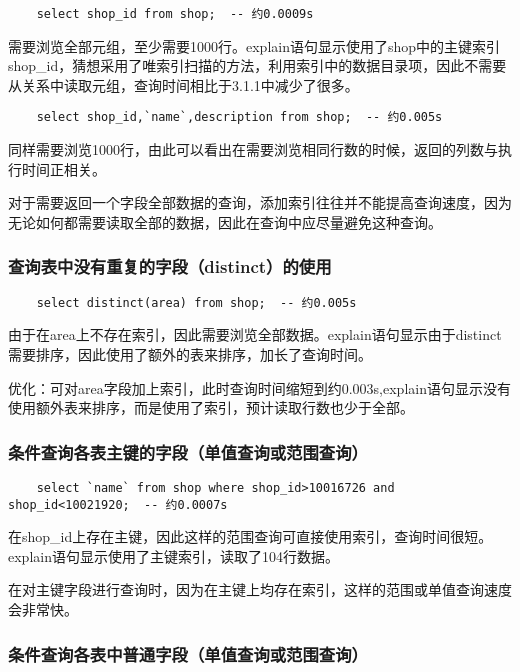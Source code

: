 \documentclass[a4paper, 11pt, nofonts, nocap, fancyhdr]{ctexart}
\begin{document}
	\begin{lstlisting}
	select shop_id from shop;  -- 约0.0009s
	\end{lstlisting}

需要浏览全部元组，至少需要1000行。explain语句显示使用了shop中的主键索引shop_id，猜想采用了唯索引扫描的方法，利用索引中的数据目录项，因此不需要从关系中读取元组，查询时间相比于3.1.1中减少了很多。

	\begin{lstlisting}
	select shop_id,`name`,description from shop;  -- 约0.005s
	\end{lstlisting}

同样需要浏览1000行，由此可以看出在需要浏览相同行数的时候，返回的列数与执行时间正相关。

对于需要返回一个字段全部数据的查询，添加索引往往并不能提高查询速度，因为无论如何都需要读取全部的数据，因此在查询中应尽量避免这种查询。

\subsubsection{查询表中没有重复的字段（distinct）的使用}

	\begin{lstlisting}
	select distinct(area) from shop;  -- 约0.005s
	\end{lstlisting}

由于在area上不存在索引，因此需要浏览全部数据。explain语句显示由于distinct需要排序，因此使用了额外的表来排序，加长了查询时间。

优化：可对area字段加上索引，此时查询时间缩短到约0.003s,explain语句显示没有使用额外表来排序，而是使用了索引，预计读取行数也少于全部。

\subsubsection{条件查询各表主键的字段（单值查询或范围查询）}

	\begin{lstlisting}
	select `name` from shop where shop_id>10016726 and shop_id<10021920;  -- 约0.0007s
	\end{lstlisting}

在shop_id上存在主键，因此这样的范围查询可直接使用索引，查询时间很短。explain语句显示使用了主键索引，读取了104行数据。

在对主键字段进行查询时，因为在主键上均存在索引，这样的范围或单值查询速度会非常快。

\subsubsection{条件查询各表中普通字段（单值查询或范围查询）}
	
\end{document}
